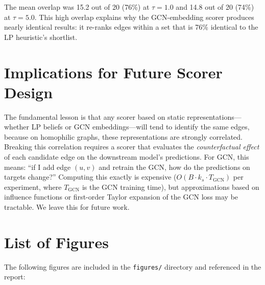 \documentclass[12pt,a4paper,oneside]{report}
\begin{document}
The mean overlap was 15.2 out of 20 (76\%) at $\tau = 1.0$ and 14.8 out of 20 (74\%) at $\tau = 5.0$. This high overlap explains why the GCN-embedding scorer produces nearly identical results: it re-ranks edges within a set that is 76\% identical to the LP heuristic's shortlist.

\section{Implications for Future Scorer Design}

The fundamental lesson is that any scorer based on static representations---whether LP beliefs or GCN embeddings---will tend to identify the same edges, because on homophilic graphs, these representations are strongly correlated. Breaking this correlation requires a scorer that evaluates the \emph{counterfactual effect} of each candidate edge on the downstream model's predictions. For GCN, this means: ``if I add edge $(u,v)$ and retrain the GCN, how do the predictions on targets change?'' Computing this exactly is expensive ($O(B \cdot k_s \cdot T_{\text{GCN}})$ per experiment, where $T_{\text{GCN}}$ is the GCN training time), but approximations based on influence functions or first-order Taylor expansion of the GCN loss may be tractable. We leave this for future work.

\section{List of Figures}

The following figures are included in the \texttt{figures/} directory and referenced in the report:
\end{document}

